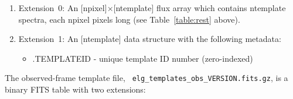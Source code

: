 \documentclass[12pt]{article}
\begin{document}
\begin{enumerate}
\item{Extension~0: An [{\sc npixel}]$\times$[{\sc ntemplate}] flux
  array which contains {\sc ntemplate} spectra, each {\sc npixel}
  pixels long (see Table~\ref{table:rest} above).}
\item{Extension~1: An [{\sc ntemplate}] data structure with the
  following metadata:
\begin{itemize}
\item{.{\sc TEMPLATEID} - unique template ID number (zero-indexed)}
\end{itemize}
}
\end{enumerate}

The observed-frame template file, {\tt
  elg\_templates\_obs\_VERSION.fits.gz}, is a binary FITS table with
two extensions:
\end{document}
